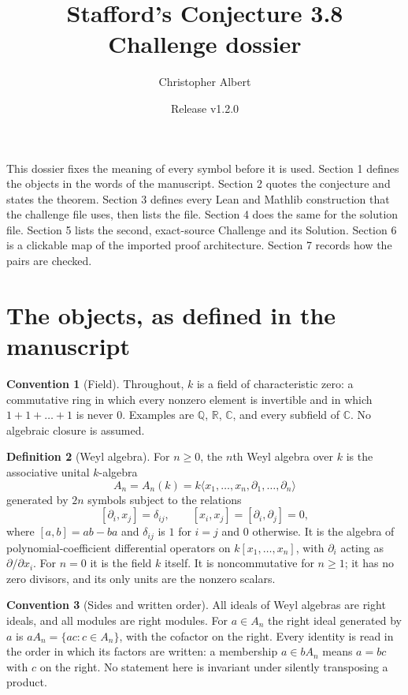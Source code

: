 \documentclass[11pt,a4paper]{article}
\title{Stafford's Conjecture 3.8\\[0.3em]\large Challenge dossier}
\author{Christopher Albert}
\date{Release v1.2.0}
\theoremstyle{definition}
\newtheorem{definition}{Definition}
\newtheorem{convention}[definition]{Convention}
\theoremstyle{plain}
\begin{document}
\maketitle

\noindent
This dossier fixes the meaning of every symbol before it is used. Section 1
defines the objects in the words of the manuscript. Section 2 quotes the
conjecture and states the theorem. Section 3 defines every Lean and Mathlib
construction that the challenge file uses, then lists the file. Section 4
does the same for the solution file. Section 5 lists the second, exact-source
Challenge and its Solution. Section 6 is a clickable map of the imported
proof architecture. Section 7 records how the pairs are checked.

\section{The objects, as defined in the manuscript}

\begin{convention}[Field]
Throughout, $k$ is a field of characteristic zero: a commutative ring in which
every nonzero element is invertible and in which $1+1+\dots+1$ is never $0$.
Examples are $\mathbb{Q}$, $\mathbb{R}$, $\mathbb{C}$, and every subfield of
$\mathbb{C}$. No algebraic closure is assumed.
\end{convention}

\begin{definition}[Weyl algebra]
For $n\ge 0$, the $n$th Weyl algebra over $k$ is the associative unital
$k$-algebra
\[
  A_n=A_n(k)=k\langle x_1,\dots,x_n,\partial_1,\dots,\partial_n\rangle
\]
generated by $2n$ symbols subject to the relations
\[
  [\partial_i,x_j]=\delta_{ij},\qquad [x_i,x_j]=[\partial_i,\partial_j]=0,
\]
where $[a,b]=ab-ba$ and $\delta_{ij}$ is $1$ for $i=j$ and $0$ otherwise. It is
the algebra of polynomial-coefficient differential operators on
$k[x_1,\dots,x_n]$, with $\partial_i$ acting as $\partial/\partial x_i$. For
$n=0$ it is the field $k$ itself. It is noncommutative for $n\ge 1$; it has no
zero divisors, and its only units are the nonzero scalars.
\end{definition}

\begin{convention}[Sides and written order]
All ideals of Weyl algebras are right ideals, and all modules are right
modules. For $a\in A_n$ the right ideal generated by $a$ is
$aA_n=\{ac : c\in A_n\}$, with the cofactor on the right. Every identity is
read in the order in which its factors are written: a membership $a\in bA_n$
means $a=bc$ with $c$ on the right. No statement here is invariant under
silently transposing a product.
\end{convention}
\end{document}
